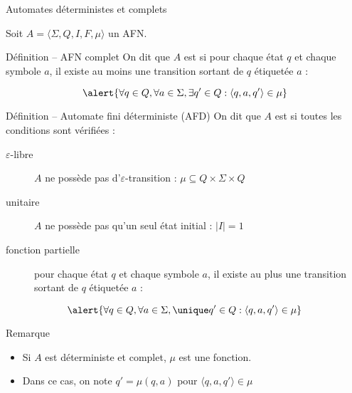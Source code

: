 
\begingroup

\begin{frame}{Automates déterministes et complets}

  \vspace{-1mm}
  \small 
  Soit $A = \langle \Sigma, Q, I, F, \mu \rangle$ un AFN.

  \vspace{-1mm}
  \begin{block}{Définition -- AFN complet}
    On dit que $A$ est  si pour chaque état $q$ et chaque symbole $a$, il existe au moins une transition sortant de $q$ étiquetée $a$ :

    \vspace{-3mm}
    $$\alert{\forall q\in Q,  \forall a\in \Sigma, \exists q' \in Q : \langle q,a, q' \rangle \in \mu}$$
  \end{block}
  
  \vspace{-3mm}
  \begin{block}{Définition -- Automate fini déterministe (AFD)}
    On dit que $A$ est  si toutes les conditions sont vérifiées : 
    \begin{description}
    \item[$\varepsilon$-libre] $A$ ne possède pas d'$\varepsilon$-transition : \alert{$\mu \subseteq Q \times \Sigma \times Q$}
    \item[unitaire] $A$ ne possède pas qu'un seul état initial : \alert{$|I| = 1$}
    \item[fonction partielle]  pour chaque état $q$ et chaque symbole $a$, il existe au plus une transition sortant de $q$ étiquetée $a$ : 
    \end{description}
    $$\alert{\forall q\in Q,  \forall a\in \Sigma, \unique q' \in Q : \langle q, a, q' \rangle \in \mu}$$
  \end{block}


  \vspace{-2mm}
  \begin{alertblock}{Remarque}
    \begin{itemize}
    \item \vspace{-3mm} Si $A$ est déterministe et complet, $\mu$ est une fonction.
    \item \vspace{-1mm} Dans ce cas, on note $q' = \mu(q, a)$ pour $\langle q, a, q' \rangle \in \mu$
    \end{itemize}
  \end{alertblock}
\end{frame}

\endgroup
